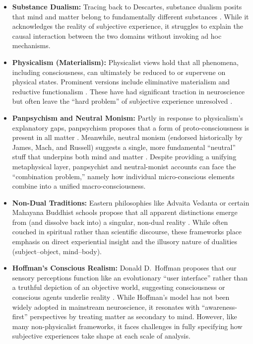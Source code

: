 \documentclass[12pt,a4paper]{article}
\begin{document}
\begin{itemize}
    \item \textbf{Substance Dualism:} Tracing back to Descartes, substance dualism posits that mind and matter belong to fundamentally different substances \cite{descartes1641}. While it acknowledges the reality of subjective experience, it struggles to explain the causal interaction between the two domains without invoking ad hoc mechanisms.
    \item \textbf{Physicalism (Materialism):} Physicalist views hold that all phenomena, including consciousness, can ultimately be reduced to or supervene on physical states. Prominent versions include eliminative materialism and reductive functionalism \cite{churchland1989}. These have had significant traction in neuroscience but often leave the ``hard problem'' of subjective experience unresolved \cite{chalmers1995}.
    \item \textbf{Panpsychism and Neutral Monism:} Partly in response to physicalism's explanatory gaps, panpsychism proposes that a form of proto-consciousness is present in all matter \cite{skrbinapsp}. Meanwhile, neutral monism (endorsed historically by James, Mach, and Russell) suggests a single, more fundamental ``neutral'' stuff that underpins both mind and matter \cite{mach1886analysis, russell1921analysis}. Despite providing a unifying metaphysical layer, panpsychist and neutral-monist accounts can face the ``combination problem,'' namely how individual micro-conscious elements combine into a unified macro-consciousness.
    \item \textbf{Non-Dual Traditions:} Eastern philosophies like Advaita Vedanta or certain Mahayana Buddhist schools propose that all apparent distinctions emerge from (and dissolve back into) a singular, non-dual reality \cite{ramacandra1923upanishads, garfield2002emptiness}. While often couched in spiritual rather than scientific discourse, these frameworks place emphasis on direct experiential insight and the illusory nature of dualities (subject--object, mind--body).

    \item \textbf{Hoffman’s Conscious Realism:}
    Donald D.~Hoffman proposes that our sensory perceptions function like an evolutionary ``user interface'' rather than a truthful depiction of an objective world, suggesting consciousness or conscious agents underlie reality \cite{hoffman2015,hoffman2019case}. While Hoffman's model has not been widely adopted
    in mainstream neuroscience, it resonates with ``awareness-first'' perspectives by treating matter as secondary to mind. However, like many non-physicalist frameworks, it faces challenges in fully specifying how subjective experiences take shape at each scale of analysis.
\end{itemize}
\end{document}
